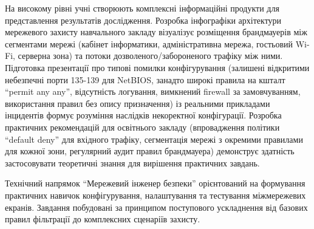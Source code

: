 На високому рівні учні створюють комплексні інформаційні продукти для представлення результатів дослідження. Розробка інфографіки архітектури мережевого захисту навчального закладу візуалізує розміщення брандмауерів між сегментами мережі (кабінет інформатики, адміністративна мережа, гостьовий Wi-Fi, серверна зона) та потоки дозволеного/забороненого трафіку між ними. Підготовка презентації про типові помилки конфігурування (залишені відкритими небезпечні порти 135-139 для NetBIOS, занадто широкі правила на кшталт ``permit any any'', відсутність логування, вимкнений firewall за замовчуванням, використання правил без опису призначення) із реальними прикладами інцидентів формує розуміння наслідків некоректної конфігурації. Розробка практичних рекомендацій для освітнього закладу (впровадження політики ``default deny'' для вхідного трафіку, сегментація мережі з окремими правилами для кожної зони, регулярний аудит правил брандмауера) демонструє здатність застосовувати теоретичні знання для вирішення практичних завдань.




Технічний напрямок ``Мережевий інженер безпеки'' орієнтований на формування практичних навичок конфігурування, налаштування та тестування міжмережевих екранів. Завдання побудовані за принципом поступового ускладнення від базових правил фільтрації до комплексних сценаріїв захисту.


